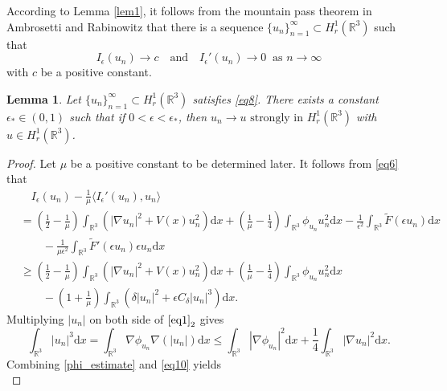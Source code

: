 \documentclass[12pt]{amsart}
\numberwithin{equation}{section}
\newtheorem{lemma}[theorem]{Lemma}
\theoremstyle{definition}
\def\qaq{\quad\text{and}\quad}
\begin{document}
According to Lemma \ref{lem1}, it follows from the mountain pass theorem in Ambrosetti and Rabinowitz \cite{MR370183} that there is a sequence $\{u_n\}_{n=1}^\infty\subset H^1_r(\mathbb R^3)$ such that
\begin{equation}\label{eq8}
	I_{\epsilon}(u_n)\rightarrow c \qaq I_{\epsilon}'(u_n)\rightarrow 0\ \text{ as }n\rightarrow\infty
\end{equation}
with $c$ be a positive constant.
\begin{lemma}\label{lem2}
Let $\{u_n\}_{n=1}^\infty\subset H^1_r(\mathbb R^3)$ satisfies \eqref{eq8}. There exists a constant $\epsilon_*\in(0,1)$ such that if $0<\epsilon<\epsilon_*$, then $u_n\rightarrow u\text{ strongly in }H^1_r(\mathbb R^3)$ with $u\in H^1_r(\mathbb R^3)$.
\end{lemma}
\begin{proof}
	Let $\mu$ be a positive constant to be determined later. It follows from \eqref{eq6} that
	\begin{equation}\label{eq9}
		\begin{split}
		&\quad I_{\epsilon}(u_n)-\frac{1}{\mu}\langle I_{\epsilon}'(u_n),u_n\rangle\\
		&=\left(\frac{1}{2}-\frac{1}{\mu}\right)\int_{\mathbb R^3}\left(|\nabla u_n|^2+V(x)u_n^2\right)\text{d}x+\left(\frac{1}{\mu}-\frac{1}{4}\right)\int_{\mathbb R^3}\phi_{u_n}u_n^2\text{d}x-\frac{1}{\epsilon^2}\int_{\mathbb R^3}\tilde F(\epsilon u_n)\text{d}x\\
		&\quad\quad-\frac{1}{\mu\epsilon^2}\int_{\mathbb R^3}\tilde F'(\epsilon u_n)\epsilon u_n\text{d}x\\
		&\geq\left(\frac{1}{2}-\frac{1}{\mu}\right)\int_{\mathbb R^3}\left(|\nabla u_n|^2+V(x)u_n^2\right)\text{d}x+\left(\frac{1}{\mu}-\frac{1}{4}\right)\int_{\mathbb R^3}\phi_{u_n}u_n^2\text{d}x\\
		&\quad\quad-\left(1+\frac{1}{\mu}\right)\int_{\mathbb R^3}\left(\delta |u_n|^2+\epsilon C_\delta |u_n|^3\right)\text{d}x.
	\end{split}\end{equation}
Multiplying $|u_n|$ on both side of $\eqref{eq1}_2$ gives
\begin{equation}\label{eq10}
	\int_{\mathbb R^3}|u_n|^3\text{d}x=\int_{\mathbb R^3}{\nabla\phi_{u_n}}\nabla(|u_n|)\text{d}x\leq\int_{\mathbb R^3}|\nabla\phi_{u_n}|^2\text{d}x+\frac{1}{4}\int_{\mathbb R^3}|\nabla u_n|^2\text{d}x.
\end{equation}
Combining \eqref{phi_estimate} and \eqref{eq10} yields
\begin{equation}\label{eq11}

\end{equation}
\end{proof}
\end{document}
